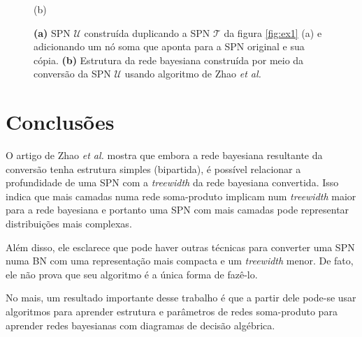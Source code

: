 \begin{figure}
\begin{minipage}{0.35\textwidth}
{
    }

    (b)
  \end{minipage}

  \caption{
    \textbf{(a)} SPN $\mathcal{U}$ construída duplicando a SPN $\mathcal{T}$ da figura \ref{fig:ex1} (a) e adicionando um nó soma que aponta para a SPN original e sua cópia.
    \textbf{(b)} Estrutura da rede bayesiana construída por meio da conversão da SPN $\mathcal{U}$ usando algoritmo de Zhao \emph{et al.}
  }
  \label{fig:ex2}
\end{figure}

\section{Conclusões}

O artigo de Zhao \emph{et al.} \cite{Zhao2015} mostra que embora a rede bayesiana resultante da conversão tenha estrutura simples (bipartida), é possível relacionar a profundidade de uma SPN com a \emph{treewidth} da rede bayesiana convertida. Isso indica que mais camadas numa rede soma-produto implicam num \emph{treewidth} maior para a rede bayesiana e portanto uma SPN com mais camadas pode representar distribuições mais complexas.

Além disso, ele esclarece que pode haver outras técnicas para converter uma SPN numa BN com uma representação mais compacta e um \emph{treewidth} menor. De fato, ele não prova que seu algoritmo é a única forma de fazê-lo.

No mais, um resultado importante desse trabalho é que a partir dele pode-se usar algoritmos para aprender estrutura e parâmetros de redes soma-produto para aprender redes bayesianas com diagramas de decisão algébrica.
